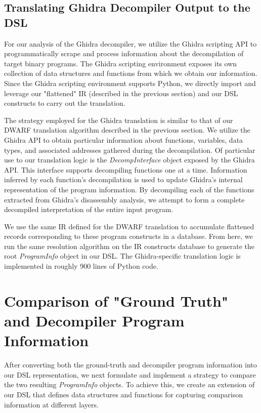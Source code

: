 \subsection{Translating Ghidra Decompiler Output to the DSL}

For our analysis of the Ghidra decompiler, we utilize the Ghidra scripting API to programmatically scrape and process information about the decompilation of target binary programs. The Ghidra scripting environment exposes its own collection of data structures and functions from which we obtain our information. Since the Ghidra scripting environment supports Python, we directly import and leverage our "flattened" IR (described in the previous section) and our DSL constructs to carry out the translation.

The strategy employed for the Ghidra translation is similar to that of our DWARF translation algorithm described in the previous section. We utilize the Ghidra API to obtain particular information about functions, variables, data types, and associated addresses gathered during the decompilation. Of particular use to our translation logic is the \emph{DecompInterface} object exposed by the Ghidra API. This interface supports decompiling functions one at a time. Information inferred by each function's decompilation is used to update Ghidra's internal representation of the program information. By decompiling each of the functions extracted from Ghidra's disassembly analysis, we attempt to form a complete decompiled interpretation of the entire input program.

We use the same IR defined for the DWARF translation to accumulate flattened records corresponding to these program constructs in a database. From here, we run the same resolution algorithm on the IR constructs database to generate the root \emph{ProgramInfo} object in our DSL. The Ghidra-specific translation logic is implemented in roughly 900 lines of Python code.

\section{Comparison of "Ground Truth" and Decompiler Program Information}

After converting both the ground-truth and decompiler program information into our DSL representation, we next formulate and implement a strategy to compare the two resulting \emph{ProgramInfo} objects. To achieve this, we create an extension of our DSL that defines data structures and functions for capturing comparison information at different layers.

